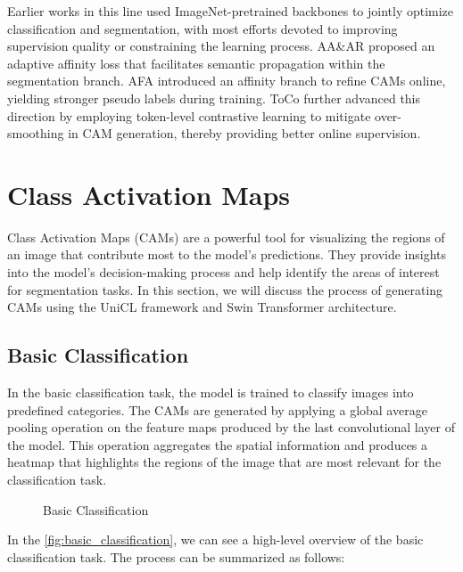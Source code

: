 Earlier works in this line used ImageNet-pretrained backbones \cite{dataset_imagenet} to jointly optimize classification and segmentation, with most efforts devoted to improving supervision quality or constraining the learning process. AA\&AR \cite{wsss_aaar} proposed an adaptive affinity loss that facilitates semantic propagation within the segmentation branch. AFA \cite{wsss_afa_affinity_from_attention} introduced an affinity branch to refine CAMs online, yielding stronger pseudo labels during training. ToCo \cite{wsss_toco_token_contrast} further advanced this direction by employing token-level contrastive learning to mitigate over-smoothing in CAM generation, thereby providing better online supervision.

\section{Class Activation Maps}
\label{sec:class-activation-maps}

Class Activation Maps (CAMs) are a powerful tool for visualizing the regions of an
image that contribute most to the model's predictions. They provide insights into the
model's decision-making process and help identify the areas of interest for
segmentation tasks. In this section, we will discuss the process of generating CAMs
using the UniCL framework and Swin Transformer architecture.

\subsection{Basic Classification}
\label{subsec:basic_classification}

In the basic classification task, the model is trained to classify images into predefined categories. The CAMs are generated by applying a global average pooling operation on the feature maps produced by the last convolutional layer of the model. This operation aggregates the spatial information and produces a heatmap that highlights the regions of the image that are most relevant for the classification task.

\begin{figure}[htbp]
    \centering
    \caption{Basic Classification}
    \label{fig:basic_classification}
\end{figure}

In the \autoref{fig:basic_classification}, we can see a high-level overview of the basic classification task. The process can be summarized as follows:

